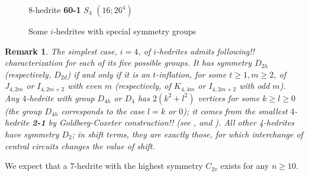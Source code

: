 \documentclass[12pt]{article}
\newtheorem{remark}{Remark}
\begin{document}
\begin{figure}
{%
\begin{minipage}[t]{4cm}
\centering
\epsfxsize=4cm
\par
{$8$-hedrite {\bf 60-1} $S_4$ $(16;26^4)$}
\end{minipage}
}
\caption{Some $i$-hedrites with special symmetry groups}
\label{special-i-hedrites}
\end{figure}








\begin{remark}
The simplest case, $i=4$, of $i$-hedrites admits following!! characterization for each of
its five possible groups.
It has symmetry $D_{2h}$  (respectively, $D_{2d}$) if and only if it is an
$t$-inflation, for some $t \ge 1, m \ge 2$, of $J_{4,2m}$ or $I_{4,2m+2}$
with even $m$ (respectively, of $K_{4,4m}$ or $I_{4,2m+2}$ with odd $m$).
Any $4$-hedrite with group $D_{4h}$ or $D_4$ has $2(k^2+l^2)$ vertices for
some $k \ge l \ge 0$ (the group $D_{4h}$ corresponds to the case $l=k$ or $0$);
it comes from the smallest $4$-hedrite {\bf 2-1} by Goldberg-Coxeter
construction!! (see \cite{Gold37}, \cite{Cox71} and \cite{DD03}).
All other 4-hedrites have symmetry $D_2$; in shift terms, they are exactly those, for which interchange of central circuits changes the value of shift.
\end{remark}

We expect that a $7$-hedrite with the highest symmetry $C_{2v}$ 
exists for any $n\geq 10$.
\end{document}
